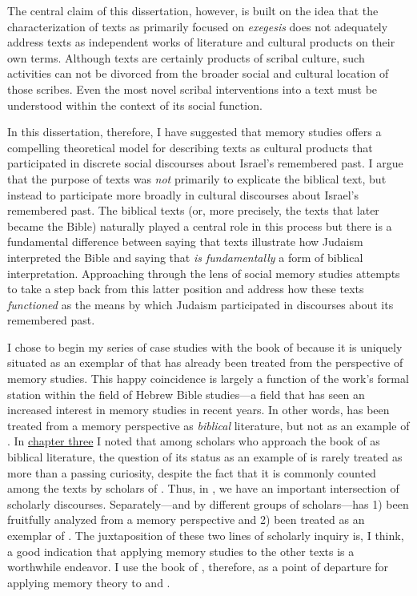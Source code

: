 The central claim of this dissertation, however, is built on the idea that the characterization of \rwb texts as primarily focused on \emph{exegesis} does not adequately address \rwb texts as independent works of literature and cultural products on their own terms. Although \rwb texts are certainly products of scribal culture, such activities can not be divorced from the broader social and cultural location of those scribes. Even the most novel scribal interventions into a text must be understood within the context of its social function.

In this dissertation, therefore, I have suggested that memory studies offers a compelling theoretical model for describing \rwb texts as cultural products that participated in discrete social discourses about Israel's remembered past. I argue that the purpose of \rwb texts was \emph{not} primarily to explicate the biblical text, but instead to participate more broadly in cultural discourses about Israel's remembered past. The biblical texts (or, more precisely, the texts that later became the Bible) naturally played a central role in this process but there is a fundamental difference between saying that \rwb texts illustrate how \secondtemple Judaism interpreted the Bible and saying that \rwb \emph{is fundamentally} a form of biblical interpretation. Approaching \rwb through the lens of social memory studies attempts to take a step back from this latter position and address how these texts \emph{functioned} as the means by which \secondtemple Judaism participated in discourses about its remembered past.

I chose to begin my series of case studies with the book of \chronicles because it is uniquely situated as an exemplar of \rwb that has already been treated from the perspective of memory studies. This happy coincidence is largely a function of the work's formal station within the field of Hebrew Bible studies---a field that has seen an increased interest in memory studies in recent years. In other words, \chronicles has been treated from a memory perspective as \emph{biblical} literature, but not as an example of \rwb. In \hyperref[chap:chronicles]{chapter three} I noted that among scholars who approach the book of \chronicles as biblical literature, the question of its status as an example of \rwb is rarely treated as more than a passing curiosity, despite the fact that it is commonly counted among the \rwb texts by scholars of \rwb. Thus, in \chronicles, we have an important intersection of scholarly discourses. Separately---and by different groups of scholars---\chronicles has 1) been fruitfully analyzed from a memory perspective and 2) been treated as an exemplar of \rwb. The juxtaposition of these two lines of scholarly inquiry is, I think, a good indication that applying memory studies to the other \rwb texts is a worthwhile endeavor. I use the book of \chronicles, therefore, as a point of departure for applying memory theory to \ga and \jub. 

